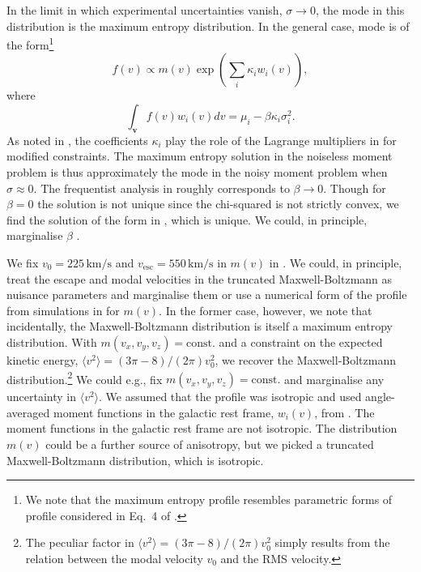 \documentclass{article}
\begin{document}
In the limit in which experimental uncertainties vanish, $\sigma \to 0$, the mode in this distribution is the maximum entropy distribution. In the general case, mode is of the form\footnote{We note that the maximum entropy profile resembles parametric forms of profile considered in Eq.~4 of .}
\begin{equation}\label{eq:sol}
f(v) \propto m(v) \exp\left(\sum_i \kappa_i w_i(v)\right),
\end{equation}
where
\begin{equation}
\int_{\mathbf v} f(v) w_i(v) dv = \mu_i - \beta \kappa_i \sigma_i^2.
\end{equation}
As noted in , the coefficients $\kappa_i$ play the role of the Lagrange multipliers in  for modified constraints. The maximum entropy solution in the noiseless moment problem is thus approximately the mode in the noisy moment problem when $\sigma \approx 0$. The frequentist analysis in  roughly corresponds to $\beta \to 0$. Though for $\beta = 0$ the solution is not unique since the chi-squared is not strictly convex, we find the solution of the form in , which is unique. We could, in principle, marginalise $\beta$ .

We fix $v_0 =225 \,\text{km/s}$ and $v_\text{esc} = 550\,\text{km/s}$ in $m(v)$ in  . We could, in principle, treat the escape and modal velocities in the truncated Maxwell-Boltzmann as nuisance parameters and marginalise them or use a numerical form of the profile from simulations in  for $m(v)$.  In the former case, however, we note that incidentally, the Maxwell-Boltzmann distribution is itself a maximum entropy distribution. With $m(v_x, v_y, v_z) = \text{const.}$ and a constraint on the expected kinetic energy, $\langle v^2 \rangle = (3\pi - 8)/ (2\pi) v_0^2$, we recover the Maxwell-Boltzmann distribution.\footnote{The peculiar factor in  $\langle v^2 \rangle = (3\pi - 8)/ (2\pi) v_0^2$ simply results from the relation between the modal velocity $v_0$ and the RMS velocity.} We could e.g., fix $m(v_x, v_y, v_z) = \text{const.}$ and marginalise any uncertainty in $\langle v^2 \rangle$.
We assumed that the profile was isotropic and used angle-averaged moment functions in the galactic rest frame, $w_i(v)$, from . The moment functions in the galactic rest frame are not isotropic. The distribution $m(v)$ could be a further source of anisotropy, but we picked a truncated Maxwell-Boltzmann distribution, which is isotropic. 
\end{document}
